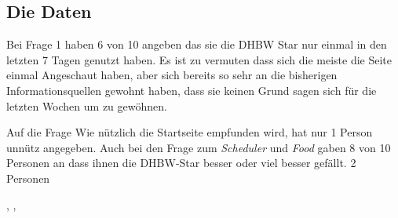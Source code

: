 \subsection{Die Daten}
\begin{figure}
	\centering
\end{figure}
Bei Frage 1 haben 6 von 10 angeben das sie die DHBW Star nur einmal in den letzten 7 Tagen genutzt haben. Es ist zu vermuten dass sich die meiste die Seite einmal Angeschaut haben, aber sich bereits so sehr an die bisherigen Informationsquellen gewohnt haben, dass sie keinen Grund sagen sich für die letzten Wochen um zu gewöhnen.

Auf die Frage Wie nützlich die Startseite empfunden wird, hat nur 1 Person unnütz angegeben. 
Auch bei den Frage zum \emph{Scheduler} und \emph{Food} gaben 8 von 10 Personen an dass ihnen die DHBW-Star besser oder viel besser gefällt.
2 Personen 
\begin{figure}
	\centering
\end{figure}




 \cite{fragebogenKallus}, \cite{fragebogenRolf}, \cite{bachelorprint}